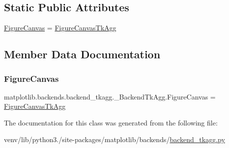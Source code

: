 \subsection*{Static Public Attributes}
\begin{DoxyCompactItemize}
\item 
\hyperlink{classmatplotlib_1_1backends_1_1backend__tkagg_1_1__BackendTkAgg_afa007aa1512bf053032c9af712a5b2fc}{Figure\+Canvas} = \hyperlink{classmatplotlib_1_1backends_1_1backend__tkagg_1_1FigureCanvasTkAgg}{Figure\+Canvas\+Tk\+Agg}
\end{DoxyCompactItemize}


\subsection{Member Data Documentation}
\mbox{\label{classmatplotlib_1_1backends_1_1backend__tkagg_1_1__BackendTkAgg_afa007aa1512bf053032c9af712a5b2fc}} 
\subsubsection{\texorpdfstring{Figure\+Canvas}{FigureCanvas}}
{\footnotesize\ttfamily matplotlib.\+backends.\+backend\+\_\+tkagg.\+\_\+\+Backend\+Tk\+Agg.\+Figure\+Canvas = \hyperlink{classmatplotlib_1_1backends_1_1backend__tkagg_1_1FigureCanvasTkAgg}{Figure\+Canvas\+Tk\+Agg}\hspace{0.3cm}{\ttfamily [static]}}



The documentation for this class was generated from the following file\+:\begin{DoxyCompactItemize}
\item 
venv/lib/python3./site-\/packages/matplotlib/backends/\hyperlink{backend__tkagg_8py}{backend\+\_\+tkagg.\+py}\end{DoxyCompactItemize}

